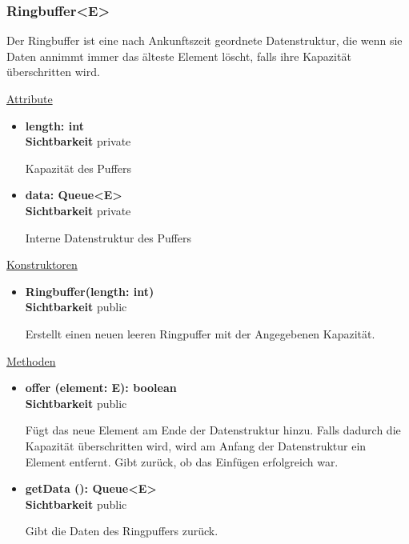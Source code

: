 \subsubsection{Ringbuffer<E>} \label{app:klasse:Ringbuffer}
Der Ringbuffer ist eine nach Ankunftszeit geordnete Datenstruktur, die wenn sie Daten annimmt immer das älteste Element löscht, falls ihre Kapazität überschritten wird. \newline

\underline{Attribute}
\begin{itemize}
\itemsep0pt
\item \textbf{length: int} \hfill\\ 
\textbf{Sichtbarkeit} private

Kapazität des Puffers

\item \textbf{data: Queue<E>} \hfill\\ 
\textbf{Sichtbarkeit} private

Interne Datenstruktur des Puffers
\end{itemize}

\underline{Konstruktoren}
\begin{itemize}
\itemsep0pt
\item \textbf{Ringbuffer(length: int)} \hfill\\
\textbf{Sichtbarkeit} public

Erstellt einen neuen leeren Ringpuffer mit der Angegebenen Kapazität.
\end{itemize}

\underline{Methoden}
\begin{itemize}
\itemsep0pt
\item \textbf{offer (element: E): boolean}\hfill\\
\textbf{Sichtbarkeit} public

Fügt das neue Element am Ende der Datenstruktur hinzu. Falls dadurch die Kapazität überschritten wird, wird am Anfang der Datenstruktur ein Element entfernt. Gibt zurück, ob das Einfügen erfolgreich war.

\item \textbf{getData (): Queue<E>}\hfill\\
\textbf{Sichtbarkeit} public

Gibt die Daten des Ringpuffers zurück.

\end{itemize}